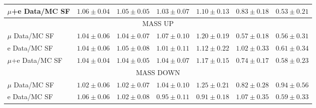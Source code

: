 \begin{table}[!h]
\begin{center}
{\begin{tabular}{l||c||c|c|c|c|c}
\hline
$\mu$+e Data/MC SF 		  & $1.06 \pm 0.04$ & $1.05 \pm 0.05$ & $1.03 \pm 0.07$ & $1.10 \pm 0.13$ & $0.83 \pm 0.18$ & $0.53 \pm 0.21$ \\
\hline
\hline
\multicolumn{7}{c}{MASS UP} \\
\hline
$\mu$ Data/MC SF 	  & $1.04 \pm 0.06$ & $1.04 \pm 0.07$ & $1.07 \pm 0.10$ & $1.20 \pm 0.19$ & $0.57 \pm 0.18$ & $0.56 \pm 0.31$ \\
\hline
e Data/MC SF 	  & $1.04 \pm 0.06$ & $1.05 \pm 0.08$ & $1.01 \pm 0.11$ & $1.12 \pm 0.22$ & $1.02 \pm 0.33$ & $0.61 \pm 0.34$ \\
\hline
$\mu$+e Data/MC SF 		  & $1.04 \pm 0.04$ & $1.04 \pm 0.05$ & $1.04 \pm 0.07$ & $1.17 \pm 0.15$ & $0.74 \pm 0.17$ & $0.58 \pm 0.23$ \\
\hline
\hline
\multicolumn{7}{c}{MASS DOWN} \\
\hline
$\mu$ Data/MC SF 	  & $1.02 \pm 0.06$ & $1.02 \pm 0.07$ & $1.04 \pm 0.10$ & $1.25 \pm 0.21$ & $0.82 \pm 0.28$ & $0.94 \pm 0.56$ \\
\hline
e Data/MC SF 	  & $1.06 \pm 0.06$ & $1.02 \pm 0.08$ & $0.95 \pm 0.11$ & $0.91 \pm 0.18$ & $1.07 \pm 0.35$ & $0.59 \pm 0.33$ \\

\end{tabular}}
\end{center}
\end{table}
